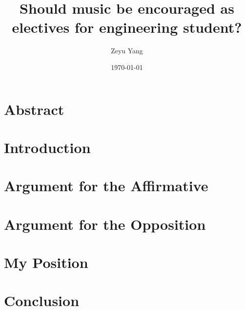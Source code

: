 \documentclass[titlepage,a4paper]{report}
\begin{document}
    \title{Should music be encouraged as electives for engineering student?}
    \author{Zeyu Yang}
    \date{\today}
    \maketitle
    \tableofcontents
    \chapter{Abstract}
    
    \chapter{Introduction}
    
    \chapter{Argument for the Affirmative}
    
    \chapter{Argument for the Opposition}
    
    \chapter{My Position}
    
    \chapter{Conclusion}
    
    \begin{appendix}
        
    \end{appendix}
\end{document}
